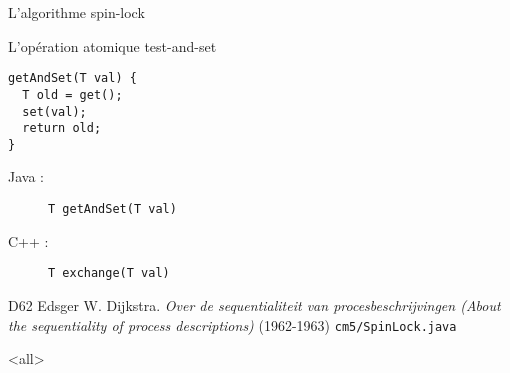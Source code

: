 \begin{frame}[fragile]{L'algorithme spin-lock}


\begin{block}{L'opération \alert{atomique} test-and-set}
    \vspace{-2mm}
    \begin{minipage}{.3\textwidth}
    \begin{lstlisting}[numbers=none]
getAndSet(T val) {
  T old = get();
  set(val);
  return old;
}
    \end{lstlisting}
    \end{minipage}
    \hfill    
    \begin{minipage}{.5\textwidth}
    \begin{description}
    \item [Java :] \lstinline{T getAndSet(T val)}
    \item [C++ :] \lstinline{T exchange(T val)}
    \end{description}
    \end{minipage}
    \vspace{-2mm}
  \end{block}

  \vFill
  \begin{citing}
  \item[D62] Edsger W. Dijkstra. \textit{Over de sequentialiteit van procesbeschrijvingen (About the sequentiality of process descriptions)} (1962-1963)
  \jitem \lstinline{cm5/SpinLock.java}
  \end{citing}
\end{frame}


\mode<all>


